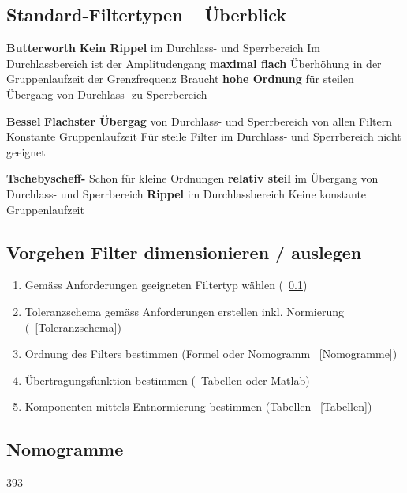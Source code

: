 \subsection{Standard-Filtertypen -- Überblick}
\label{Standard-Filtertypen}

\begin{outline}
    \1 \textbf{Butterworth}
        \2[+] \textbf{Kein Rippel} im Durchlass- und Sperrbereich
        \2[+] Im Durchlassbereich ist der Amplitudengang \textbf{maximal flach}
        \2[-] Überhöhung in der Gruppenlaufzeit der Grenzfrequenz
        \2[-] Braucht \textbf{hohe Ordnung} für steilen Übergang von Durchlass- zu Sperrbereich

    \1 \textbf{Bessel}
        \2[+] \textbf{Flachster Übergag} von Durchlass- und Sperrbereich von allen Filtern
        \2[+] Konstante Gruppenlaufzeit
        \2[-] Für steile Filter im Durchlass- und Sperrbereich nicht geeignet

    \1 \textbf{Tschebyscheff-}
        \2[+] Schon für kleine Ordnungen \textbf{relativ steil} im Übergang von Durchlass- und Sperrbereich
        \2[-] \textbf{Rippel} im Durchlassbereich
        \2[-] Keine konstante Gruppenlaufzeit
\end{outline}


\subsection{Vorgehen Filter dimensionieren / auslegen}

\begin{enumerate}
    \item Gemäss Anforderungen geeigneten Filtertyp wählen (\textrightarrow\ \ref{Standard-Filtertypen})
    \item Toleranzschema gemäss Anforderungen erstellen inkl. Normierung (\textrightarrow\ \ref{Toleranzschema})
    \item Ordnung des Filters bestimmen (Formel oder Nomogramm \textrightarrow\ \ref{Nomogramme})
    \item Übertragungsfunktion bestimmen (\textrightarrow\ Tabellen oder Matlab)
    \item Komponenten mittels Entnormierung bestimmen (Tabellen \textrightarrow\ \ref{Tabellen})
\end{enumerate}


\subsection{Nomogramme}{393}
\label{Nomogramme}

